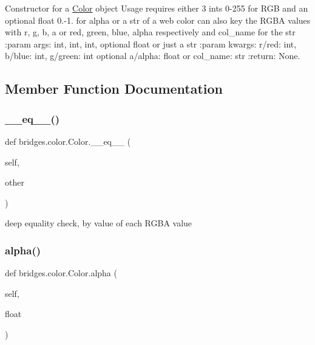 Constructor for a \mbox{\hyperlink{classbridges_1_1color_1_1_color}{Color}} object Usage requires either 3 ints 0-\/255 for R\+GB and an optional float 0.-\/1. for alpha or a str of a web color can also key the R\+G\+BA values with r, g, b, a or red, green, blue, alpha respectively and col\+\_\+name for the str \+:param args\+: int, int, int, optional float or just a str \+:param kwargs\+: r/red\+: int, b/blue\+: int, g/green\+: int optional a/alpha\+: float or col\+\_\+name\+: str \+:return\+: None. 



\subsection{Member Function Documentation}
\mbox{\label{classbridges_1_1color_1_1_color_ae5677a0858252f0b33da13866fb62786}} 
\subsubsection{\texorpdfstring{\+\_\+\+\_\+eq\+\_\+\+\_\+()}{\_\_eq\_\_()}}
{\footnotesize\ttfamily def bridges.\+color.\+Color.\+\_\+\+\_\+eq\+\_\+\+\_\+ (\begin{DoxyParamCaption}\item[{}]{self,  }\item[{}]{other }\end{DoxyParamCaption})}



deep equality check, by value of each R\+G\+BA value 

\mbox{\label{classbridges_1_1color_1_1_color_ae5dc631fcda27156867b21109620ae21}} 
\subsubsection{\texorpdfstring{alpha()}{alpha()}\hspace{0.1cm}{\footnotesize\ttfamily [1/2]}}
{\footnotesize\ttfamily def bridges.\+color.\+Color.\+alpha (\begin{DoxyParamCaption}\item[{}]{self,  }\item[{}]{float }\end{DoxyParamCaption})}



